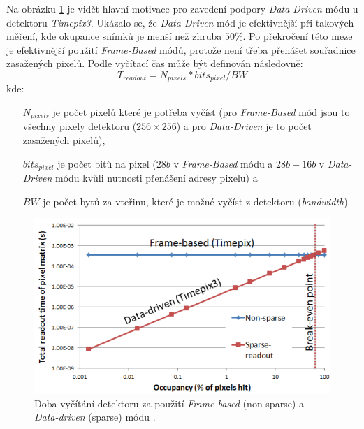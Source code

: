 Na obrázku \ref{fig:det:frame_vs_event_driven} je vidět hlavní motivace pro zavedení podpory \textit{Data-Driven} módu u detektoru \textit{Timepix3}. Ukázalo se, že \textit{Data-Driven} mód je efektivnější při takových měření, kde okupance snímků je menší než zhruba $50\%$. Po překročení této meze je efektivnější použití \textit{Frame-Based} módů, protože není třeba přenášet souřadnice zasažených pixelů. Podle \cite{timepix3} vyčítací čas může být definován následovně:
\begin{equation}\label{eq:det:readout_time}
	T_{readout} = N_{pixels}*bits_{pixel}/BW
\end{equation}
kde:
\begin{changemargin}{1.5cm}{1cm} 
	\begin{itemize}
		\item[$N_{pixels}$] je počet pixelů které je potřeba vyčíst (pro \textit{Frame-Based} mód jsou to všechny pixely detektoru ($256\times256$) a pro \textit{Data-Driven} je to počet zasažených pixelů),
		\item[$bits_{pixel}$] je počet bitů na pixel ($28 b$ v \textit{Frame-Based} módu a $28b + 16b$ v \textit{Data-Driven} módu kvůli nutnosti přenášení adresy pixelu) a
		\item[$BW$] je počet bytů za vteřinu, které je možné vyčíst z detektoru (\textit{bandwidth}). 
	\end{itemize}
\end{changemargin}

\begin{figure}[th]
	\begin{center}
		\includegraphics[width=14cm]{figures/det_frame_vs_event_driven.png}
		\caption{Doba vyčítání detektoru za použití \textit{Frame-based} (non-sparse) a \textit{Data-driven} (sparse) módu \cite{timepix3}.}
		\label{fig:det:frame_vs_event_driven}
	\end{center}
\end{figure}

